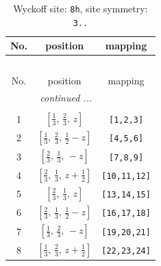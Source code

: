 \documentclass[fleqn,8pt]{jsarticle}
\begin{document}
\begin{longtable}{ccc}
\caption{Wyckoff site: {\tt 8h}, site symmetry: {\tt 3..}}
 \\
 \hline \hline
No. & position & mapping \\ \hline \endfirsthead

\multicolumn{2}{l}{\tablename\ \thetable{}} \\
 \hline \hline
No. & position & mapping \\ \hline \endhead

 \hline \hline
\multicolumn{2}{r}{\footnotesize\it continued ...} \\ \endfoot

 \hline \hline
\multicolumn{2}{r}{} \\ \endlastfoot

1 & $\left[ \frac{1}{3},\, \frac{2}{3},\, z \right]$ & {\tt [1,2,3]} \\ \hline
2 & $\left[ \frac{1}{3},\, \frac{2}{3},\, \frac{1}{2} - z \right]$ & {\tt [4,5,6]} \\ \hline
3 & $\left[ \frac{2}{3},\, \frac{1}{3},\, - z \right]$ & {\tt [7,8,9]} \\ \hline
4 & $\left[ \frac{2}{3},\, \frac{1}{3},\, z + \frac{1}{2} \right]$ & {\tt [10,11,12]} \\ \hline
5 & $\left[ \frac{2}{3},\, \frac{1}{3},\, z \right]$ & {\tt [13,14,15]} \\ \hline
6 & $\left[ \frac{2}{3},\, \frac{1}{3},\, \frac{1}{2} - z \right]$ & {\tt [16,17,18]} \\ \hline
7 & $\left[ \frac{1}{3},\, \frac{2}{3},\, - z \right]$ & {\tt [19,20,21]} \\ \hline
8 & $\left[ \frac{1}{3},\, \frac{2}{3},\, z + \frac{1}{2} \right]$ & {\tt [22,23,24]} \\
\end{longtable}
\renewcommand{\arraystretch}{1.2}
\end{document}
